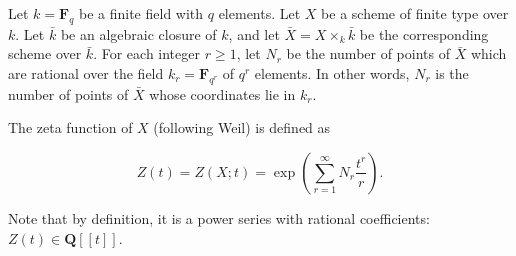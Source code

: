 Let $k = \mathbf{F}_q$ be a finite field with $q$ elements. Let $X$ be a scheme of finite type over $k$. Let $\bar{k}$ be an algebraic closure of $k$, and let $\bar{X} = X \times_k \bar{k}$ be the corresponding scheme over $\bar{k}$. For each integer $r \geqslant 1$, let $N_r$ be the number of points of $\bar{X}$ which are rational over the field $k_r = \mathbf{F}_{q^r}$ of $q^r$ elements. In other words, $N_r$ is the number of points of $\bar{X}$ whose coordinates lie in $k_r$.

The zeta function of $X$ (following Weil) is defined as

$$Z(t) = Z(X; t) = \exp \left( \sum_{r=1}^{\infty} N_r \frac{t^r}{r} \right).$$

Note that by definition, it is a power series with rational coefficients: $Z(t) \in \mathbf{Q}[[t]]$.